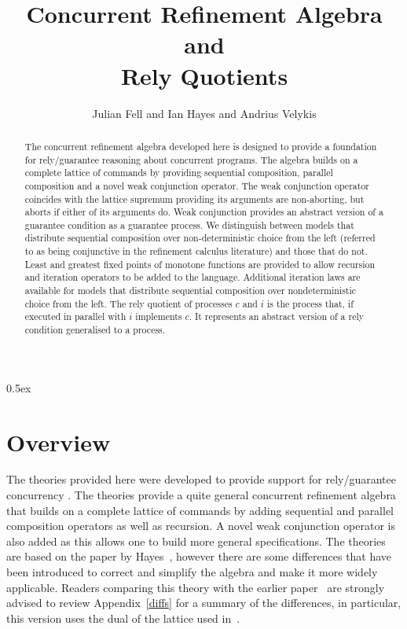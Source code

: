 \documentclass[12pt,a4paper]{article}
\begin{document}
\title{Concurrent Refinement Algebra and \\ Rely Quotients}
\author{Julian Fell and Ian Hayes and Andrius Velykis}
\maketitle

\begin{abstract}
The concurrent refinement algebra developed here is designed to provide a 
foundation for rely/guarantee reasoning about concurrent programs.
The algebra builds on a complete lattice of commands by providing
sequential composition, parallel composition and a novel weak conjunction operator.
The weak conjunction operator coincides with the lattice supremum 
providing its arguments are non-aborting, but aborts if either of its arguments do.
Weak conjunction provides an abstract version of a guarantee condition
as a guarantee process.
We distinguish between models that distribute sequential composition
over non-deterministic choice from the left 
(referred to as being conjunctive in the refinement calculus literature)
and those that do not.
Least and greatest fixed points of monotone functions are provided to
allow recursion and iteration operators to be added to the language.
Additional iteration laws are available for models
that distribute sequential composition over nondeterministic choice from the left.
The rely quotient of processes $c$ and $i$ is the process that, 
if executed in parallel with $i$ implements $c$.
It represents an abstract version of a rely condition generalised to a process.
\end{abstract}

\newpage
\tableofcontents
\parindent 0pt\parskip 0.5ex

\newpage
\section{Overview}

The theories provided here were developed to provide support 
for rely/guarantee concurrency \cite{Jones81d,jon83a}.
The theories provide a quite general concurrent refinement algebra
that builds on a complete lattice of commands
by adding sequential and parallel composition operators
as well as recursion.
A novel weak conjunction operator is also added as this allows one to build
more general specifications.
The theories are based on the paper by Hayes~\cite{AFfGRGRACP},
however there are some differences that have been introduced to correct and simplify
the algebra and make it more widely applicable.
Readers comparing this theory with the earlier paper~\cite{AFfGRGRACP}
are strongly advised to review Appendix~\ref{diffs} for a summary of the differences,
in particular, this version uses the dual of the lattice used in~\cite{AFfGRGRACP}.
\end{document}
